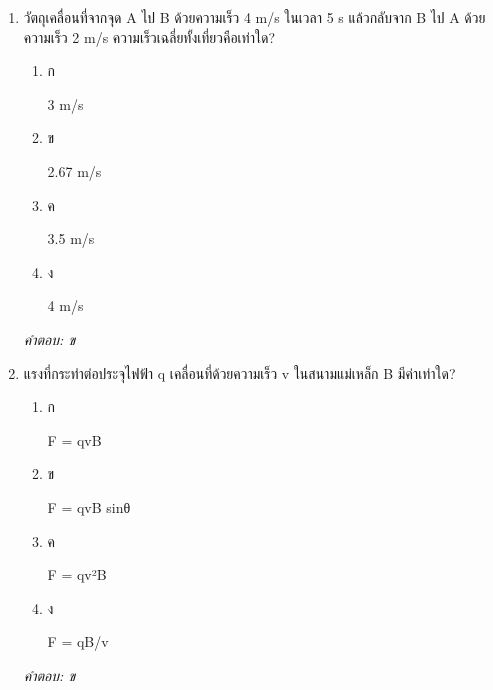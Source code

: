 \documentclass[12pt]{article}
\begin{document}
\begin{enumerate}[label=\arabic*., itemsep=0.5\baselineskip, topsep=0.5\baselineskip, leftmargin=*]
\item วัตถุเคลื่อนที่จากจุด A ไป B ด้วยความเร็ว 4 m/s ในเวลา 5 s แล้วกลับจาก B ไป A ด้วยความเร็ว 2 m/s ความเร็วเฉลี่ยทั้งเที่ยวคือเท่าใด?
\begin{enumerate}[label=\alph*)., itemsep=0.3\baselineskip, topsep=0.3\baselineskip]
\item ก\ 
\begin{minipage}[t]{0.9\linewidth}
\raggedright 3 m/s
\end{minipage}
\item ข\ 
\begin{minipage}[t]{0.9\linewidth}
\raggedright 2.67 m/s
\end{minipage}
\item ค\ 
\begin{minipage}[t]{0.9\linewidth}
\raggedright 3.5 m/s
\end{minipage}
\item ง\ 
\begin{minipage}[t]{0.9\linewidth}
\raggedright 4 m/s
\end{minipage}
\end{enumerate}
\vspace{-0.3\baselineskip}
\begin{small}
\textit{คำตอบ: ข}
\end{small}

\item แรงที่กระทำต่อประจุไฟฟ้า q เคลื่อนที่ด้วยความเร็ว v ในสนามแม่เหล็ก B มีค่าเท่าใด?
\begin{enumerate}[label=\alph*)., itemsep=0.3\baselineskip, topsep=0.3\baselineskip]
\item ก\ 
\begin{minipage}[t]{0.9\linewidth}
\raggedright F = qvB
\end{minipage}
\item ข\ 
\begin{minipage}[t]{0.9\linewidth}
\raggedright F = qvB sinθ
\end{minipage}
\item ค\ 
\begin{minipage}[t]{0.9\linewidth}
\raggedright F = qv²B
\end{minipage}
\item ง\ 
\begin{minipage}[t]{0.9\linewidth}
\raggedright F = qB/v
\end{minipage}
\end{enumerate}
\vspace{-0.3\baselineskip}
\begin{small}
\textit{คำตอบ: ข}
\end{small}


\end{enumerate}
\end{document}
